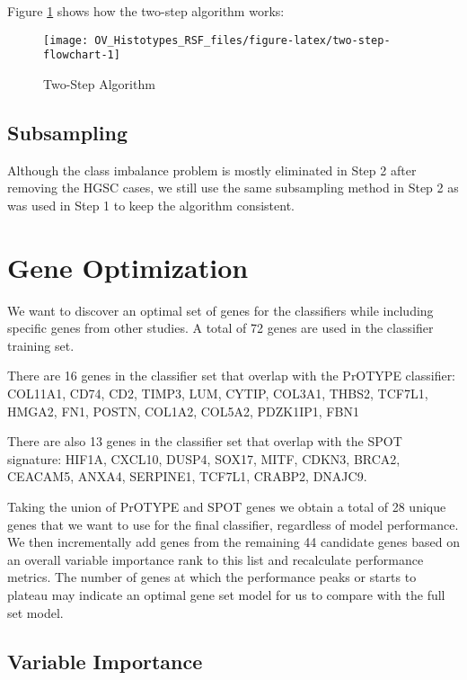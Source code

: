 \documentclass[
]{report}
\begin{document}
Figure \ref{fig:two-step-flowchart} shows how the two-step algorithm works:

\begin{figure}[H]

{\centering \texttt{[image: OV\_Histotypes\_RSF\_files/figure-latex/two-step-flowchart-1]} 

}

\caption{Two-Step Algorithm}\label{fig:two-step-flowchart}
\end{figure}

\hypertarget{subsampling-2}{%
\subsection{Subsampling}\label{subsampling-2}}

Although the class imbalance problem is mostly eliminated in Step 2 after removing the HGSC cases, we still use the same subsampling method in Step 2 as was used in Step 1 to keep the algorithm consistent.

\hypertarget{gene-optimization}{%
\section{Gene Optimization}\label{gene-optimization}}

We want to discover an optimal set of genes for the classifiers while including specific genes from other studies. A total of 72 genes are used in the classifier training set.

There are 16 genes in the classifier set that overlap with the PrOTYPE classifier: COL11A1, CD74, CD2, TIMP3, LUM, CYTIP, COL3A1, THBS2, TCF7L1, HMGA2, FN1, POSTN, COL1A2, COL5A2, PDZK1IP1, FBN1

There are also 13 genes in the classifier set that overlap with the SPOT signature: HIF1A, CXCL10, DUSP4, SOX17, MITF, CDKN3, BRCA2, CEACAM5, ANXA4, SERPINE1, TCF7L1, CRABP2, DNAJC9.

Taking the union of PrOTYPE and SPOT genes we obtain a total of 28 unique genes that we want to use for the final classifier, regardless of model performance. We then incrementally add genes from the remaining 44 candidate genes based on an overall variable importance rank to this list and recalculate performance metrics. The number of genes at which the performance peaks or starts to plateau may indicate an optimal gene set model for us to compare with the full set model.

\hypertarget{variable-importance}{%
\subsection{Variable Importance}\label{variable-importance}}
\end{document}
